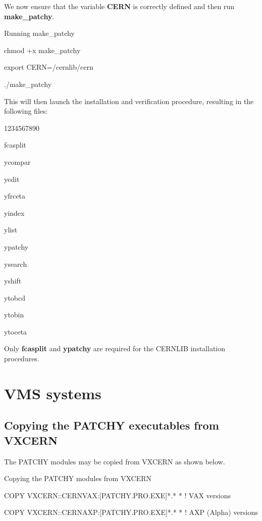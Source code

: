 We now ensure that the variable {\bf CERN} is correctly defined
and then run {\bf make\_patchy}.

\begin{XMPt}{Running make\_patchy}

chmod +x make_patchy

export CERN=/cernlib/cern

./make_patchy

\end{XMPt}

This will then launch the installation and verification procedure,
resulting in the following files:

\begin{DLtt}{1234567890}
\item[fcasplit]
\item[ycompar]
\item[yedit]
\item[yfrceta]
\item[yindex]
\item[ylist]
\item[ypatchy]
\item[ysearch]
\item[yshift]
\item[ytobcd]
\item[ytobin]
\item[ytoceta]
\end{DLtt}

Only {\bf fcasplit} and {\bf ypatchy} are required for the CERNLIB installation
procedures.

\section{VMS systems}

\label{sect-VMSPATCHY}

\subsection{Copying the PATCHY executables from VXCERN}

The PATCHY modules may be copied from VXCERN as shown below.

\begin{XMPt}{Copying the PATCHY modules from VXCERN}

COPY VXCERN::CERNVAX:[PATCHY.PRO.EXE]*.* * ! VAX versions

COPY VXCERN::CERNAXP:[PATCHY.PRO.EXE]*.* * ! AXP (Alpha) versions

\end{XMPt}
